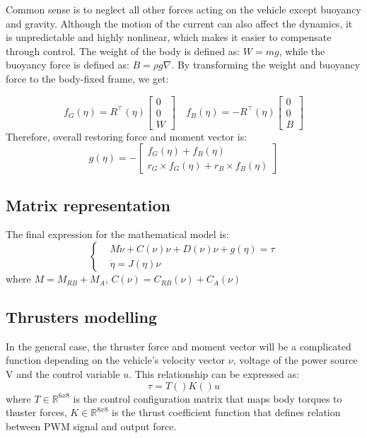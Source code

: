     Common sense is to neglect all other forces acting on the vehicle except buoyancy and gravity. 
    Although the motion of the current can also affect the dynamics, it is unpredictable and highly nonlinear, 
    which makes it easier to compensate through control.
    The weight of the body is defined as: $W=m g$, 
    while the buoyancy force is defined as: $B=\rho g \nabla$. 
    By transforming the weight and buoyancy force to the body-fixed frame, we get:

    $$
    f_G\left(\eta\right)=R^{\top}\left(\eta\right)\left[\begin{array}{l}
    0 \\
    0 \\
    W
    \end{array}\right] \quad f_B\left(\eta\right)=-R^{\top}\left(\eta\right)\left[\begin{array}{l}
    0 \\
    0 \\
    B
    \end{array}\right]
    $$
    Therefore, overall restoring force and moment vector is:
    $$
    g(\eta)=-\left[\begin{array}{c}
    f_G(\eta)+f_B(\eta) \\
    r_G \times f_G(\eta)+r_B \times f_B(\eta)
    \end{array}\right]
    $$

\subsection{Matrix representation}

    The final expression for the mathematical model is:
    $$
    \begin{cases}
    & M \dot{\nu}+C(\nu) \nu+D(\nu) \nu+g(\eta)=\tau \\
    & \dot{\eta}=J(\eta) \nu
    \end{cases}
    $$
    where
    $M=M_{R B}+M_A$, $C(\nu)=C_{R B}(\nu)+C_A(\nu)$

    \subsection{Thrusters modelling}

    In the general case, the thruster force and moment vector will be 
    a complicated function depending on the vehicle's velocity vector $\nu$, 
    voltage of the power source V 
    and the control variable $u$.
    This relationship can be expressed as:
    $$
    \tau=T()K()u
    $$
    where $T \in \mathbb{R}^{6 x 8}$ is the control configuration matrix that maps body torques to thuster forces, 
    $K \in \mathbb{R}^{8 x 8}$ is the thrust coefficient function that defines relation between
    PWM signal and output force.


